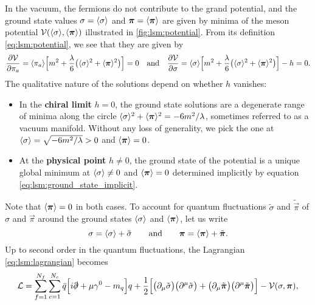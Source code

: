 In the vacuum, the fermions do not contribute to the grand potential,
and the ground state values $\sigma = \langle \sigma \rangle$ and ${\bm{\pi}} = \langle {\bm{\pi}} \rangle$
are given by minima of the meson potential $\mathcal{V}(\langle \sigma \rangle,\langle {\bm{\pi}} \rangle)$ illustrated in \cref{fig:lsm:potential}.
From its definition \eqref{eq:lsm:potential},
we see that they are given by
\begin{equation}
	\pdv{\mathcal{V}}{\pi_a} = \langle \pi_a \rangle \Big[ m^2 + \frac{\lambda}{6} \big(\langle \sigma \rangle^2 + \langle {\bm{\pi}} \rangle^2\big) \Big] = 0
	\quad \text{and} \quad
	\pdv{\mathcal{V}}{\sigma} = \langle \sigma \rangle \Big[ m^2 + \frac{\lambda}{6} \big(\langle \sigma \rangle^2 + \langle {\bm{\pi}} \rangle^2\big) \Big] - h = 0.
\label{eq:lsm:ground_state_implicit}
\end{equation}
The qualitative nature of the solutions depend on whether $h$ vanishes:
\begin{itemize}
\item In the \textbf{chiral limit} $h=0$,
      the ground state solutions are a degenerate range of minima along the circle $\langle \sigma \rangle^2+\langle {\bm{\pi}} \rangle^2=-6m^2/\lambda$,
      sometimes referred to as a vacuum manifold.
      Without any loss of generality, we pick the one at $\langle \sigma \rangle = \sqrt{-6m^2/\lambda}>0$ and $\langle {\bm{\pi}} \rangle=0$.
\item At the \textbf{physical point} $h \neq 0$,
      the ground state of the potential is a unique global minimum at $\langle \sigma \rangle \neq 0$ and $\langle {\bm{\pi}} \rangle=0$ determined implicitly by equation \eqref{eq:lsm:ground_state_implicit}.
\end{itemize}
Note that $\langle {\bm{\pi}} \rangle = 0$ in both cases.
To account for quantum fluctuations $\tilde{\sigma}$ and $\tilde{\vec{\pi}}$ of $\sigma$ and $\vec{\pi}$ around the ground states $\langle \sigma \rangle$ and $\langle {\bm{\pi}} \rangle$,
let us write
\begin{equation}
	\sigma = \langle \sigma \rangle + \tilde{\sigma}
	\qquad \text{and} \qquad
	{\bm{\pi}} = \langle {\bm{\pi}} \rangle + \tilde{{\bm{\pi}}}.
\end{equation}
Up to second order in the quantum fluctuations,
the Lagrangian \eqref{eq:lsm:lagrangian} becomes
\begin{equation}
	\lagr = \sum_{f=1}^{\smash{N_f}} \sum_{c=1}^{N_c} \bar{q} \Big[ i \slashed\partial + \mu \gamma^0 - m_q \Big] q
	      + \frac12 \Big[ \big( \partial_\mu \tilde{\sigma} \big) \big( \partial^\mu \tilde{\sigma} \big) + \big( \partial_\mu \tilde{\vec\pi} \big) \big( \partial^\mu \tilde{\vec\pi} \big) \Big] - \pot(\sigma,\vec\pi) , %
\end{equation}
